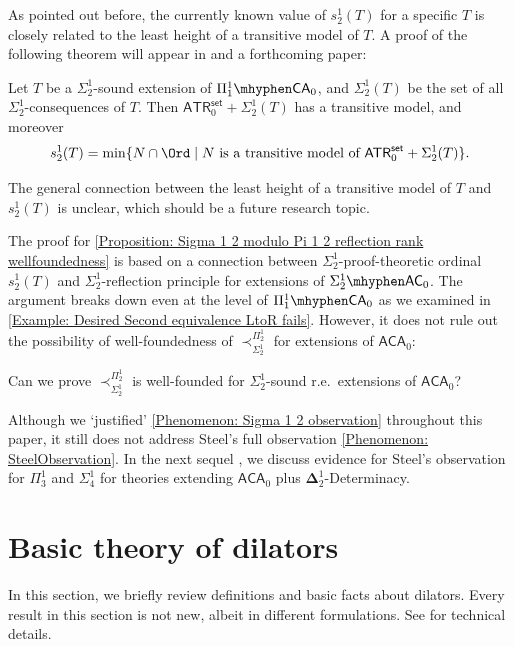 \documentclass{mhkr}
\newcommand{\added}[1]{#1}
\newcommand{\AC}{\mathsf{AC}}
\newcommand{\CA}{\mathsf{CA}}
\newcommand{\ACA}{\mathsf{ACA}}
\newcommand{\ATR}{\mathsf{ATR}}
\begin{document}
As pointed out before, the currently known value of $s^1_2(T)$ for \added{a} specific $T$ is closely related to the least height of a transitive model of $T$. \added{A proof of the following theorem will appear in \cite{JeonPhD} and a forthcoming paper:}
\begin{theorem}
    Let $T$ be a $\Sigma^1_2$-sound extension of $\Pi^1_1\mhyphen\CA_0$, and $\Sigma^1_2(T)$ be the set of all $\Sigma^1_2$-consequences of $T$. Then $\ATR_0^\mathsf{set} + \Sigma^1_2(T)$ has a transitive model, and moreover
    \begin{equation*}
        s^1_2(T) = \min\{N\cap \Ord\mid \text{$N$ is a transitive model of }\ATR_0^\mathsf{set} + \Sigma^1_2(T)\}.
    \end{equation*}
\end{theorem}
The general connection between the least height of a transitive model of $T$ and $s^1_2(T)$ is unclear, which should be a future research topic.

The proof for \autoref{Proposition: Sigma 1 2 modulo Pi 1 2 reflection rank wellfoundedness} is based on a connection between $\Sigma^1_2$-proof-theoretic ordinal $s^1_2(T)$ and $\Sigma^1_2$-reflection principle for extensions of $\Sigma^1_2\mhyphen\AC_0$.
The argument breaks down even at the level of $\Pi^1_1\mhyphen\CA_0$ as we examined in \autoref{Example: Desired Second equivalence LtoR fails}.
However, it does not rule out the possibility of well-foundedness of $\prec^{\Pi^1_2}_{\Sigma^1_2}$ for extensions of $\ACA_0$:
\begin{question}
    Can we prove $\prec^{\Pi^1_2}_{\Sigma^1_2}$ is well-founded for $\Sigma^1_2$-sound r.e.\ extensions of $\ACA_0$?
\end{question}

Although we `justified' \autoref{Phenomenon: Sigma 1 2 observation} throughout this paper, it still does not address Steel's full observation \autoref{Phenomenon: SteelObservation}. In the next sequel \cite{Jeon??HigherProofTheoryII}, we discuss evidence for Steel's observation for $\Pi^1_3$ and $\Sigma^1_4$ for theories extending $\ACA_0$ plus $\mathbf{\Delta}^1_2$-Determinacy.

\appendix

\section{Basic theory of dilators} \label{Section: Dilators}
\added{In this section, we briefly review definitions and basic facts about dilators. Every result in this section is not new, albeit in different formulations. See \cite{JeonPhD} for technical details.}
\end{document}
